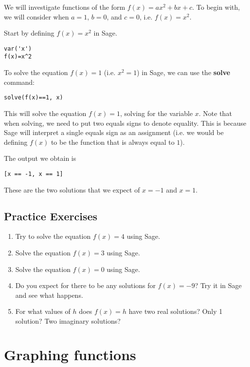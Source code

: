 \documentclass[12pt]{amsart}
\theoremstyle{definition}
\theoremstyle{definition}
\begin{document}
We will investigate functions of the form $f(x)=ax^2+bx+c$. To begin
with, we will consider when $a=1$, $b=0$, and $c=0$, i.e. $f(x)=x^2$.

Start by defining $f(x)=x^2$ in Sage.

\begin{verbatim}
var('x')
f(x)=x^2
\end{verbatim}

To solve the equation $f(x)=1$ (i.e. $x^2=1$) in Sage, we can use the
\textbf{solve} command:

\begin{verbatim}
solve(f(x)==1, x)
\end{verbatim}

This will solve the equation $f(x)=1$, solving for the variable $x$.
Note that when solving, we need to put two equals signs to denote
equality. This is because Sage will interpret a single equals sign
as an assignment (i.e. we would be defining $f(x)$ to be the function
that is always equal to $1$).

The output we obtain is

\begin{verbatim}
[x == -1, x == 1]
\end{verbatim}

These are the two solutions that we expect of $x=-1$ and $x=1$.

\subsection{Practice Exercises}

\begin{enumerate}
	\item Try to solve the equation $f(x)=4$ using Sage.
	\item Solve the equation $f(x)=3$ using Sage.
	\item Solve the equation $f(x)=0$ using Sage.
	\item Do you expect for there to be any solutions for $f(x)=-9$?
		Try it in Sage and see what happens.
	\item For what values of $h$ does $f(x)=h$ have two real solutions?
		Only 1 solution? Two imaginary solutions?
\end{enumerate}

\section{Graphing functions}
\end{document}
